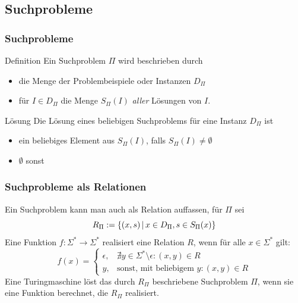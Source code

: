 \subsection{Suchprobleme}
\begin{frame}
 \frametitle{Suchprobleme}
 \begin{block}{Definition}
  Ein Suchproblem $\Pi$ wird beschrieben durch
  \begin{itemize}
   \item die Menge der Problembeispiele oder Instanzen $D_\Pi$
   \item für $I\in D_\Pi$ die Menge $S_\Pi(I)$ \emph{aller} Lösungen von $I$.
  \end{itemize}
 \end{block}
\begin{block}{Lösung}
 Die Lösung eines beliebigen Suchproblems für eine Instanz $D_\Pi$ ist
 \begin{itemize}
  \item ein beliebiges Element aus $S_\Pi(I)$, falls $S_\Pi(I) \not = \emptyset$
  \item $\emptyset$ sonst
 \end{itemize}
\end{block}
\end{frame}

\begin{frame}
\frametitle{Suchprobleme als Relationen}
Ein Suchproblem kann man auch als Relation auffassen, für $\Pi$ sei
$$ R_\Pi := \left\lbrace  (x,s)  \,\middle\vert\,  x \in D_\Pi, s\in S_\Pi(x) \right\rbrace$$
Eine Funktion $f: \Sigma^* \rightarrow \Sigma^*$ realisiert eine Relation $R$, wenn für alle $x \in \Sigma^*$ gilt:
$$f(x) = \begin{cases}
\epsilon, & \nexists y \in \Sigma^*\setminus\epsilon : (x,y) \in R\\
y, & \mbox{sonst, mit beliebigem }y:(x,y) \in R
\end{cases}$$
Eine Turingmaschine löst das durch $R_\Pi$ beschriebene Suchproblem $\Pi$, wenn sie eine Funktion berechnet, die $R_\Pi$ realisiert.
\end{frame}

